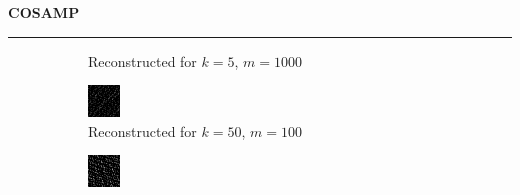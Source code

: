 \documentclass[a4paper,12pt]{article}
\newenvironment{solution}[2][]{%
    \begin{mdframed}[linecolor=blue!70!black, linewidth=2pt, roundcorner=10pt, backgroundcolor=yellow!10!white, skipabove=12pt, skipbelow=12pt]%
        \textbf{\large #2}
        \par\noindent\rule{\textwidth}{0.4pt}
}{
    \end{mdframed}
}
\begin{document}
\begin{solution}{COSAMP}
\begin{figure}[H]
\begin{subfigure}[t]{0.23\textwidth}
            \caption{Reconstructed for $k = 5$, $m = 1000$}
        \end{subfigure}
        \begin{subfigure}[t]{0.23\textwidth}
            \centering
            \includegraphics[width=\textwidth]{../images/cosamp/Reconstructed_k_50_m_100.png}
            \caption{Reconstructed for $k = 50$, $m = 100$}
        \end{subfigure}
        \begin{subfigure}[t]{0.23\textwidth}
            \centering
            \includegraphics[width=\textwidth]{../images/cosamp/Reconstructed_k_50_m_200.png}

\end{subfigure}
\end{figure}
\end{solution}
\end{document}
